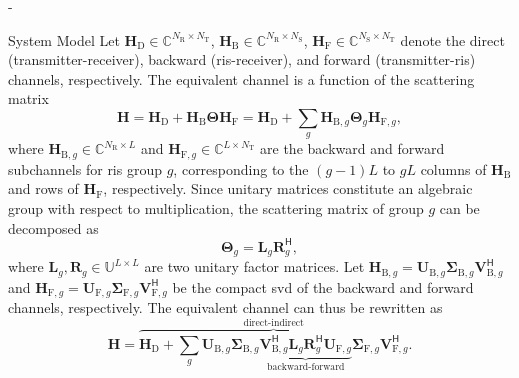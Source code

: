 \begin{section}{-}
\begin{subsection}{System Model}
		Let $\mathbf{H}_\mathrm{D} \in \mathbb{C}^{N_\mathrm{R} \times N_\mathrm{T}}$, $\mathbf{H}_\mathrm{B} \in \mathbb{C}^{N_\mathrm{R} \times N_\mathrm{S}}$, $\mathbf{H}_\mathrm{F} \in \mathbb{C}^{N_\mathrm{S} \times N_\mathrm{T}}$ denote the direct (transmitter-receiver), backward (\gls{ris}-receiver), and forward (transmitter-\gls{ris}) channels, respectively.
		The equivalent channel is a function of the scattering matrix
		\begin{equation}
			\mathbf{H} = \mathbf{H}_\mathrm{D} + \mathbf{H}_\mathrm{B} \mathbf{\Theta} \mathbf{H}_\mathrm{F} = \mathbf{H}_\mathrm{D} + \sum_g \mathbf{H}_{\mathrm{B},g} \mathbf{\Theta}_g \mathbf{H}_{\mathrm{F},g},
			\label{eq:channel_equivalent}
		\end{equation}
		where $\mathbf{H}_{\mathrm{B},g} \in \mathbb{C}^{N_\mathrm{R} \times L}$ and $\mathbf{H}_{\mathrm{F},g} \in \mathbb{C}^{L \times N_\mathrm{T}}$ are the backward and forward subchannels for \gls{ris} group $g$, corresponding to the $(g-1)L$ to $gL$ columns of $\mathbf{H}_\mathrm{B}$ and rows of $\mathbf{H}_\mathrm{F}$, respectively.
		Since unitary matrices constitute an algebraic group with respect to multiplication, the scattering matrix of group $g$ can be decomposed as
		\begin{equation}
			\mathbf{\Theta}_g = \mathbf{L}_g \mathbf{R}_g^\mathsf{H},
			\label{eq:unitary_decomposition}
		\end{equation}
		where $\mathbf{L}_g, \mathbf{R}_g \in \mathbb{U}^{L \times L}$ are two unitary factor matrices.
		Let $\mathbf{H}_{\mathrm{B},g} = \mathbf{U}_{\mathrm{B},g} \mathbf{\Sigma}_{\mathrm{B},g} \mathbf{V}_{\mathrm{B},g}^\mathsf{H}$ and $\mathbf{H}_{\mathrm{F},g} = \mathbf{U}_{\mathrm{F},g} \mathbf{\Sigma}_{\mathrm{F},g} \mathbf{V}_{\mathrm{F},g}^\mathsf{H}$ be the compact \gls{svd} of the backward and forward channels, respectively.
		The equivalent channel can thus be rewritten as
		\begin{equation}
			\mathbf{H} = \overbrace{\mathbf{H}_\mathrm{D} + \sum_g \mathbf{U}_{\mathrm{B},g} \mathbf{\Sigma}_{\mathrm{B},g} \underbrace{\mathbf{V}_{\mathrm{B},g}^\mathsf{H} \mathbf{L}_g \mathbf{R}_g^\mathsf{H} \mathbf{U}_{\mathrm{F},g}}_\text{backward-forward} \mathbf{\Sigma}_{\mathrm{F},g} \mathbf{V}_{\mathrm{F},g}^\mathsf{H}}^\text{direct-indirect}.
			\label{eq:channel_equivalent_svd}
		\end{equation}


\end{subsection}
\end{section}
